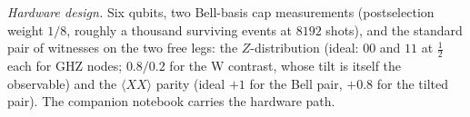 \emph{Hardware design.} Six qubits, two Bell-basis cap measurements (postselection weight $1/8$,
roughly a thousand surviving events at $8192$ shots), and the standard pair of witnesses on the two
free legs: the $Z$-distribution (ideal: $00$ and $11$ at $\tfrac12$ each for GHZ nodes; $0.8/0.2$
for the W contrast, whose tilt is itself the observable) and the $\langle XX\rangle$ parity
(ideal $+1$ for the Bell pair, $+0.8$ for the tilted pair). The companion notebook carries the
hardware path.
